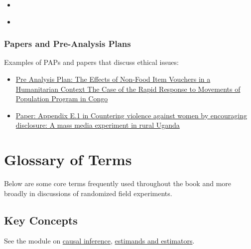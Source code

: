 \documentclass[12pt,]{book}
\begin{document}
\begin{itemize}
\item
  \autocite{Asieduetal2021ethics}
\item
  \autocite{Evans2021ethics} 
\end{itemize}

\hypertarget{papers-and-pre-analysis-plans}{%
\subsection{Papers and Pre-Analysis Plans}\label{papers-and-pre-analysis-plans}}

Examples of PAPs and papers that discuss ethical issues:

\begin{itemize}
\item
  \href{https://osf.io/eutx7/}{Pre Analysis Plan: The Effects of Non-Food Item Vouchers in a Humanitarian Context The Case of the Rapid Response to Movements of Population Program in Congo}
\item
  \href{http://jasper-cooper.com/papers/Green_et_al.pdf}{Paper: Appendix E.1 in Countering violence against women by encouraging disclosure: A mass media experiment in rural Uganda}
\end{itemize}

\cleardoublepage

\hypertarget{appendix-appendix}{%
\appendix}


\hypertarget{glossary-of-terms}{%
\chapter{Glossary of Terms}\label{glossary-of-terms}}

Below are some core terms frequently used throughout the book and more broadly in discussions of randomized field experiments.

\hypertarget{key-concepts}{%
\section{Key Concepts}\label{key-concepts}}

See the module on \href{causal-inference.html}{causal inference}, \href{estimands-and-estimators.html}{estimands and estimators}.
\end{document}
